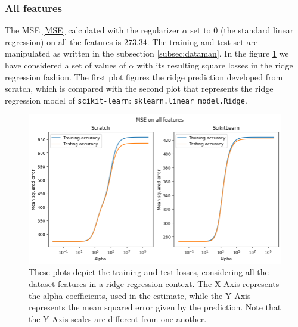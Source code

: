 \documentclass{article}
\begin{document}
\subsubsection{All features}
The MSE \eqref{MSE} calculated with the regularizer $\alpha$ set to $0$ (the standard linear regression) on all the features is $273.34$. The training and test set are manipulated as written in the subsection \ref{subsec:dataman}. In the figure \ref{rrmseall} we have considered a set of values of $\alpha$ with its resulting square losses in the ridge regression fashion. The first plot figures the ridge prediction developed from scratch, which is compared with the second plot that represents the ridge regression model of \texttt{scikit-learn}: \texttt{sklearn.linear\_model.Ridge}.
\begin{figure}[H]
	\begin{adjustwidth}{0 cm}{}
		\begin{center}
			\includegraphics[scale= 0.6]{images/MSE_all_vs.png}
		\end{center}
	\end{adjustwidth}
	\caption{These plots depict the training and test losses, considering all the dataset features in a ridge regression context. The X-Axis represents the alpha coefficients, used in the estimate, while the Y-Axis represents the mean squared error given by the prediction. Note that the Y-Axis scales are different from one another.}
	\label{rrmseall}
\end{figure}
\end{document}
